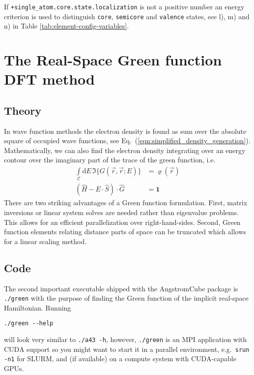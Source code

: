 \documentclass[oribibl]{llncs}
\newcommand{\ttt}[1]{\texttt{#1}}
\newcommand{\fullcodename}{AngstromCube}
\begin{document}
%
If \ttt{+single\_atom.core.state.localization} is not a positive number
an energy criterion is used to distinguish \ttt{core}, \ttt{semicore} and \ttt{valence} states, see l), m) and n) in Table \ref{tab:element-config-variables}.












\cleardoublepage
\newpage

\section{The Real-Space Green function DFT method} \label{sec:green}

\subsection{Theory}
In wave function methods the electron density is found as sum over the absolute square of occupied wave functions, see Eq.~(\ref{eqn:simplified_density_generation}).
Mathematically, we can also find the electron density integrating over an energy contour over the imaginary part of the trace of the green function, i.e.
\begin{align}
  \int\limits_{\mathcal C} \mathrm{d}E \, \Im\{ G(\vec r, \vec r; E) \} &= \varrho(\vec r) \\
  \left( \hat H - E \cdot \hat S \right) \cdot \hat G &= \mathbf{1}
\end{align}
There are two striking advantages of a Green function formulation.
First, matrix inversions or linear system solves are needed rather than eigenvalue problems.
This allows for an efficient parallelization over right-hand-sides.
Second, Green function elements relating distance parts of space can be truncated which allows for a linear scaling method.

\subsection{Code}
The second important executable shipped with the \fullcodename{} package is \ttt{./green}
with the purpose of finding the Green function of the implicit real-space Hamiltonian. Running
\begin{verbatim}
./green --help
\end{verbatim}
will look very similar to \ttt{./a43 -h}, however, \ttt{./green} is an \ac{MPI} application
with CUDA support so you might want to start it in a parallel environment, e.g.~\ttt{srun -n1} for SLURM,
and (if available) on a compute system with CUDA-capable \ac{GPU}s.
\end{document}
